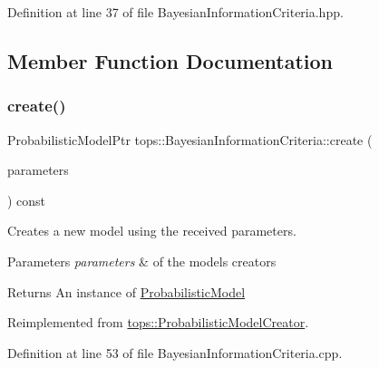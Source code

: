 Definition at line 37 of file Bayesian\+Information\+Criteria.\+hpp.



\subsection{Member Function Documentation}
\mbox{\label{classtops_1_1BayesianInformationCriteria_a025c7fff02580703f901376eea7db340}} 
\subsubsection{\texorpdfstring{create()}{create()}}
{\footnotesize\ttfamily Probabilistic\+Model\+Ptr tops\+::\+Bayesian\+Information\+Criteria\+::create (\begin{DoxyParamCaption}\item[{\hyperlink{classtops_1_1ProbabilisticModelParameters}{Probabilistic\+Model\+Parameters} \&}]{parameters }\end{DoxyParamCaption}) const\hspace{0.3cm}{\ttfamily [virtual]}}



Creates a new model using the received parameters. 


\begin{DoxyParams}{Parameters}
{\em parameters} & of the model\textquotesingle{}s creators \\
\hline
\end{DoxyParams}
\begin{DoxyReturn}{Returns}
An instance of \hyperlink{classtops_1_1ProbabilisticModel}{Probabilistic\+Model} 
\end{DoxyReturn}


Reimplemented from \hyperlink{classtops_1_1ProbabilisticModelCreator_afed6c8ffa45fff446bdaa8b533da8f7c}{tops\+::\+Probabilistic\+Model\+Creator}.



Definition at line 53 of file Bayesian\+Information\+Criteria.\+cpp.


